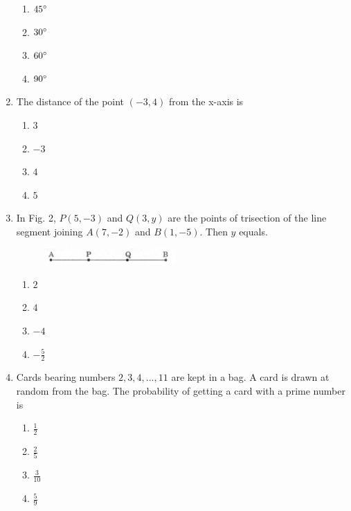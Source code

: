 \documentclass[journal,12pt,twocolumn]{IEEEtran}
\renewcommand\thesection{\arabic{section}}
\begin{document}
\begin{enumerate}[label=\thesection.\arabic*.,ref=\thesection.\theenumi]
\begin{enumerate}
    \item $45\degree$\\
    \item $30\degree$\\
    \item $60\degree$\\
    \item $90\degree$\\
 \end{enumerate}
\item The distance of the point $(-3 , 4)$ from the x-axis is
 \begin{enumerate}
    \item $3$\\
    \item $-3$\\
    \item $4$\\
    \item $5$ \\
 \end{enumerate}
\item In Fig. 2, $P(5, -3)$ and $Q(3, y)$ are the points of trisection of the line segment joining $A(7, -2)$ and $B(1, -5)$. Then $y$ equals.\\

\begin{figure}[h!]
    \centering
    \includegraphics[width=5cm]{2.png}
 \end{figure}
 \begin{enumerate}
  \item $2$\\
  \item $4$ \\
  \item $-4$ \\
  \item $-\frac{5}{2}$
\end{enumerate}
\item Cards bearing numbers $2,3,4, ..., 11$ are kept in a bag. A card is drawn at random from the bag. The probability of getting a card with a prime number is\\
 \begin{enumerate}
     \item $\frac{1}{2}$\\
     \item $\frac{2}{5}$\\
     \item $\frac{3}{10}$\\
     \item $\frac{5}{9}$\\
 \end{enumerate}
\end{enumerate}
\end{document}
